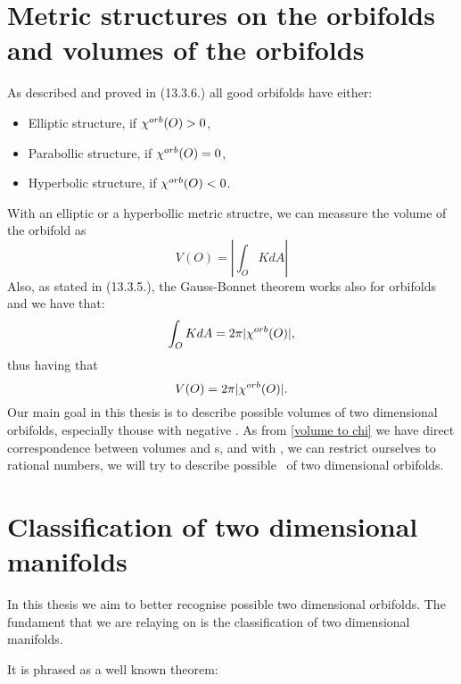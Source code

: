 \section{Metric structures on the orbifolds and volumes of the orbifolds}
As described and proved in \cite{Thurston1979} (13.3.6.) all good orbifolds have either:
\begin{itemize}
\item Elliptic structure, if ${\chi^{orb}(O)} > 0$,
\item Parabollic structure, if ${\chi^{orb}(O)} = 0$,
\item Hyperbolic structure, if ${\chi^{orb}(O)} < 0$.
\end{itemize}
With an elliptic or a hyperbollic metric structre, we can meassure the volume of the orbifold as 
\begin{equation}
V(O) = |\int_O K dA|
\end{equation} 
Also, as stated in \cite{Thurston1979} (13.3.5.), the Gauss-Bonnet theorem works also for orbifolds 
and we have that:
\begin{equation}
\int_O K dA = 2\pi|{\chi^{orb}(O)}|,
\end{equation}
thus having that 
\begin{equation}\label{volume to chi}
V(O) = 2\pi|{\chi^{orb}(O)}|.
\end{equation}
Our main goal in this thesis is to describe possible volumes of two dimensional orbifolds, 
especially thouse with negative \Eoc. As from \ref{volume to chi} we have direct correspondence 
between volumes and \Eoc s, and with \Eoc, we can restrict ourselves to rational numbers, 
we will try to describe possible \Eoc\ of two dimensional orbifolds.  

\section{Classification of two dimensional manifolds}\label{2 dim manifolds}
In this thesis we aim to better recognise possible two dimensional orbifolds. 
The fundament that we are relaying on is the classification of two dimensional manifolds. 

It is phrased as a well known theorem:
\cite{}





